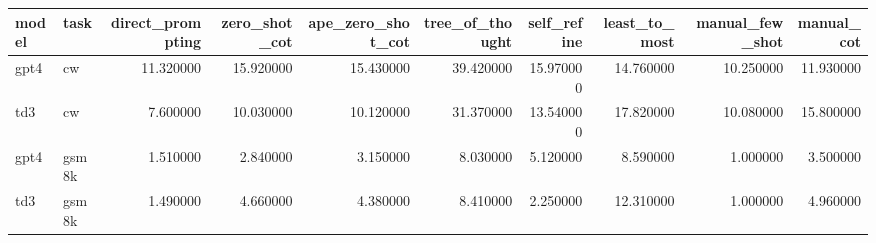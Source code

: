 \begin{tabular}{llrrrrrrrr}
\toprule
model & task & direct_prompting & zero_shot_cot & ape_zero_shot_cot & tree_of_thought & self_refine & least_to_most & manual_few_shot & manual_cot \\
\midrule
gpt4 & cw & 11.320000 & 15.920000 & 15.430000 & 39.420000 & 15.970000 & 14.760000 & 10.250000 & 11.930000 \\
td3 & cw & 7.600000 & 10.030000 & 10.120000 & 31.370000 & 13.540000 & 17.820000 & 10.080000 & 15.800000 \\
gpt4 & gsm8k & 1.510000 & 2.840000 & 3.150000 & 8.030000 & 5.120000 & 8.590000 & 1.000000 & 3.500000 \\
td3 & gsm8k & 1.490000 & 4.660000 & 4.380000 & 8.410000 & 2.250000 & 12.310000 & 1.000000 & 4.960000 \\
\bottomrule
\end{tabular}
